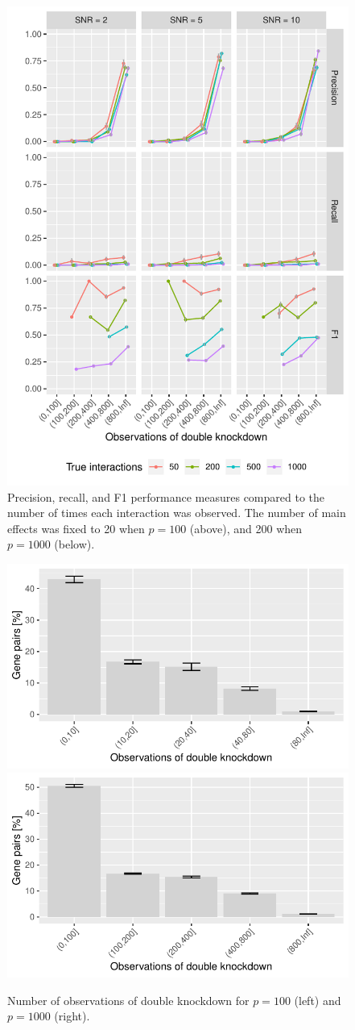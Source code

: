 \begin{figure}
\begin{minipage}{\linewidth}
	\includegraphics[width=0.5\linewidth]{"output/NumObservations_n10000_tyes"}
\end{minipage}
\caption{Precision, recall, and F1 performance measures compared to the number of times each interaction was observed. The number of main effects was fixed to 20 when $p=100$ (above), and 200 when $p=1000$ (below).}
\end{figure}

\begin{figure}
	\begin{minipage}{\linewidth}
		\centering
		\includegraphics[width=0.5\linewidth]{"output/NumObservations_n1000_percGenes"}%
		\includegraphics[width=0.5\linewidth]{"output/NumObservations_n10000_percGenes"}
	\end{minipage}
	\caption{Number of observations of double knockdown for $p = 100$ (left) and $p = 1000$ (right).}
\end{figure}


